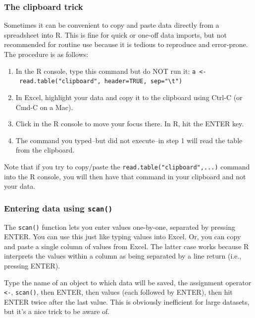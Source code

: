 \documentclass[
  13,
  letterpaper,
]{report}
\begin{document}
\subsubsection{The clipboard trick}\label{sec-04-import-special-clip}

Sometimes it can be convenient to copy and paste data directly from a
spreadsheet into R. This is fine for quick or one-off data imports, but
not recommended for routine use because it is tedious to reproduce and
error-prone. The procedure is as follows:

\begin{enumerate}
\def\labelenumi{\arabic{enumi}.}
\item
  In the R console, type this command but do NOT run it:
  \texttt{a\ \textless{}-\ read.table("clipboard",\ header=TRUE,\ sep="\textbackslash{}t")}
\item
  In Excel, highlight your data and copy it to the clipboard using
  Ctrl-C (or Cmd-C on a Mac).
\item
  Click in the R console to move your focus there. In R, hit the ENTER
  key.
\item
  The command you typed--but did not execute--in step 1 will read the
  table from the clipboard.
\end{enumerate}

Note that if you try to copy/paste the
\texttt{read.table("clipboard",...)} command into the R console, you
will then have that command in your clipboard and not your data.

\subsubsection{\texorpdfstring{Entering data using
\texttt{scan()}}{Entering data using scan()}}\label{sec-04-import-special-scan}

The \texttt{scan()} function lets you enter values one-by-one, separated
by pressing ENTER. You can use this just like typing values into Excel.
Or, you can copy and paste a single column of values from Excel. The
latter case works because R interprets the values within a column as
being separated by a line return (i.e., pressing ENTER).

Type the name of an object to which data will be saved, the assignment
operator \texttt{\textless{}-}, \texttt{scan()}, then ENTER, then values
(each followed by ENTER), then hit ENTER twice after the last value.
This is obviously inefficient for large datasets, but it's a nice trick
to be aware of.
\end{document}
